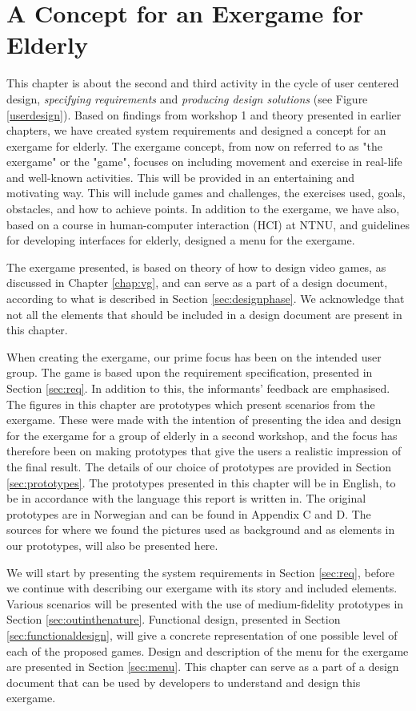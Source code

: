 \chapter{A Concept for an Exergame for Elderly}
\label{chap:concept}
This chapter is about the second and third activity in the cycle of user centered design, \emph{specifying requirements} and \emph{producing design solutions} (see Figure \ref{userdesign}). Based on findings from workshop 1 and theory presented in earlier chapters, we have created system requirements and designed a concept for an exergame for elderly. The exergame concept, from now on referred to as "the exergame" or the "game", focuses on including movement and exercise in real-life and well-known activities. This will be provided in an entertaining and motivating way. This will include games and challenges, the exercises used, goals, obstacles, and how to achieve points. In addition to the exergame, we have also, based on a course in human-computer interaction (HCI) at NTNU, and guidelines for developing interfaces for elderly, designed a menu for the exergame. 

The exergame presented, is based on theory of how to design video games, as discussed in Chapter \ref{chap:vg}, and can serve as a part of a design document, according to what is described in Section \ref{sec:designphase}. We acknowledge that not all the elements that should be included in a design document are present in this chapter.

When creating the exergame, our prime focus has been on the intended user group. The game is based upon the requirement specification, presented in Section \ref{sec:req}. In addition to this, the informants' feedback are emphasised. The figures in this chapter are prototypes which present scenarios from the exergame. These were made with the intention of presenting the idea and design for the exergame for a group of elderly in a second workshop, and the focus has therefore been on making prototypes that give the users a realistic impression of the final result. The details of our choice of prototypes are provided in Section \ref{sec:prototypes}. The prototypes presented in this chapter will be in English, to be in accordance with the language this report is written in. The original prototypes are in Norwegian and can be found in Appendix C and D. The sources for where we found the pictures used as background and as elements in our prototypes, will also be presented here. 

We will start by presenting the system requirements in Section \ref{sec:req}, before we continue with describing our exergame with its story and included elements. Various scenarios will be presented with the use of medium-fidelity prototypes in Section \ref{sec:outinthenature}. Functional design, presented in Section \ref{sec:functionaldesign}, will give a concrete representation of one possible level of each of the proposed games. Design and description of the menu for the exergame are presented in Section \ref{sec:menu}. This chapter can serve as a part of a design document that can be used by developers to understand and design this exergame.  

